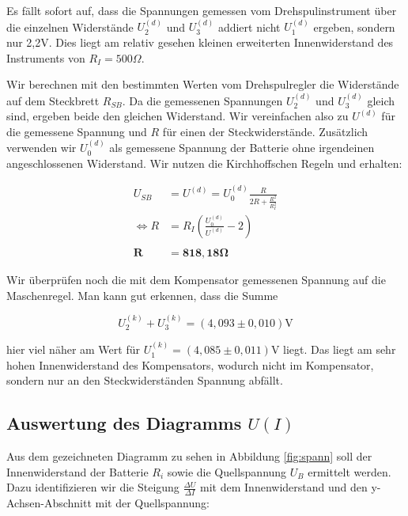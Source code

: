 \documentclass{article}
\begin{document}
Es fällt sofort auf, dass die Spannungen gemessen vom Drehspulinstrument über die einzelnen Widerstände $U_2^{(d)}$ und $U_3^{(d)}$ addiert nicht $U_1^{(d)}$ ergeben, sondern nur 2,2V. Dies liegt am relativ gesehen kleinen erweiterten Innenwiderstand des Instruments von $R_I = 500 \Omega$.

Wir berechnen mit den bestimmten Werten vom Drehspulregler die Widerstände auf dem Steckbrett $R_{SB}$. Da die gemessenen Spannungen $U_2^{(d)}$ und $U_3^{(d)}$ gleich sind, ergeben beide den gleichen Widerstand. Wir vereinfachen also zu $U^{(d)}$ für die gemessene Spannung und $R$ für einen der Steckwiderstände. Zusätzlich verwenden wir $U_0^{(d)}$ als gemessene Spannung der Batterie ohne irgendeinen angeschlossenen Widerstand. Wir nutzen die Kirchhoffschen Regeln und erhalten:

\begin{equation}
    \begin{split}
        U_{SB} &= U^{(d)} = U_0^{(d)} \frac{R}{2R + \frac{R^2}{R_I^2}} \\
        \iff R &= R_I \left( \frac{U_0^{(d)}}{U^{(d)}} -2 \right) \\ \\
        \bm{R} &= \bm{818,18 \Omega}
    \end{split}
\end{equation}

Wir überprüfen noch die mit dem Kompensator gemessenen Spannung auf die Maschenregel. Man kann gut erkennen, dass die Summe 

\begin{equation}
    U_2^{(k)} + U_3^{(k)} = (4,093 \pm 0,010) \text{V}
\end{equation}

hier viel näher am Wert für $U_1^{(k)} = (4,085 \pm 0,011)$V liegt. Das liegt am sehr hohen Innenwiderstand des Kompensators, wodurch nicht im Kompensator, sondern nur an den Steckwiderständen Spannung abfällt.

\newpage

\subsection{Auswertung des Diagramms $U(I)$}

Aus dem gezeichneten Diagramm zu sehen in Abbildung \ref{fig:spann} soll der Innenwiderstand der Batterie $R_i$ sowie die Quellspannung $U_B$ ermittelt werden. Dazu identifizieren wir die Steigung $\frac{\Delta U}{\Delta I}$ mit dem Innenwiderstand und den y-Achsen-Abschnitt mit der Quellspannung:
\end{document}
